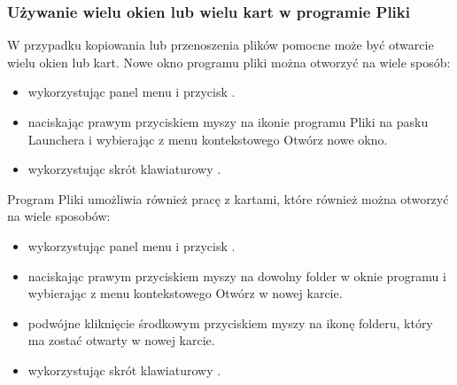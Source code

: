 \subsubsection{Używanie wielu okien lub wielu kart w programie Pliki}
W przypadku kopiowania lub przenoszenia plików pomocne może być otwarcie wielu okien lub kart. Nowe okno programu pliki można otworzyć na wiele sposób:
\begin{itemize}
\item wykorzystując panel menu i przycisk .
\item naciskając prawym przyciskiem myszy na ikonie programu Pliki na pasku Launchera i wybierając z menu kontekstowego \textcolor{ubuntu_orange}{Otwórz nowe okno}.
\item wykorzystując skrót klawiaturowy .
\end{itemize}
Program Pliki umożliwia również pracę z kartami, które również można otworzyć na wiele sposobów:
\begin{itemize}
\item wykorzystując panel menu i przycisk .
\item naciskając prawym przyciskiem myszy na dowolny folder w oknie programu i wybierając z menu kontekstowego \textcolor{ubuntu_orange}{Otwórz w nowej karcie}.
\item podwójne kliknięcie środkowym przyciskiem myszy na ikonę folderu, który ma zostać otwarty w nowej karcie.
\item wykorzystując skrót klawiaturowy .
\end{itemize}